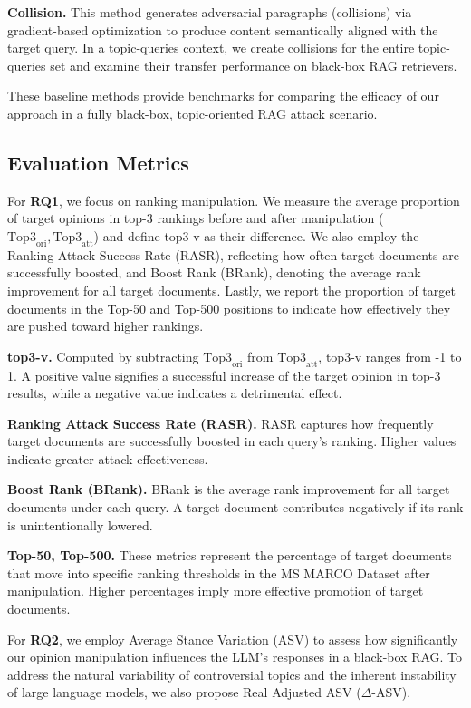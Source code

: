 \textbf{Collision.}
This method generates adversarial paragraphs (collisions) via gradient-based optimization to produce content semantically aligned with the target query. In a topic-queries context, we create collisions for the entire topic-queries set and examine their transfer performance on black-box RAG retrievers.

These baseline methods provide benchmarks for comparing the efficacy of our approach in a fully black-box, topic-oriented RAG attack scenario.

\subsection{Evaluation Metrics}

For \textbf{RQ1}, we focus on ranking manipulation. We measure the average proportion of target opinions in top-3 rankings before and after manipulation (\(\text{Top3}_{\text{ori}}, \text{Top3}_{\text{att}}\)) and define top3-v as their difference. We also employ the Ranking Attack Success Rate (RASR), reflecting how often target documents are successfully boosted, and Boost Rank (BRank), denoting the average rank improvement for all target documents. Lastly, we report the proportion of target documents in the Top-50 and Top-500 positions to indicate how effectively they are pushed toward higher rankings.

\textbf{top3-v.} Computed by subtracting \(\text{Top3}_{\text{ori}}\) from \(\text{Top3}_{\text{att}}\), top3-v ranges from -1 to 1. A positive value signifies a successful increase of the target opinion in top-3 results, while a negative value indicates a detrimental effect.

\textbf{Ranking Attack Success Rate (RASR).} RASR captures how frequently target documents are successfully boosted in each query’s ranking. Higher values indicate greater attack effectiveness.

\textbf{Boost Rank (BRank).} BRank is the average rank improvement for all target documents under each query. A target document contributes negatively if its rank is unintentionally lowered.

\textbf{Top-50, Top-500.} These metrics represent the percentage of target documents that move into specific ranking thresholds in the MS MARCO Dataset after manipulation. Higher percentages imply more effective promotion of target documents. 


For \textbf{RQ2}, we employ Average Stance Variation (ASV) to assess how significantly our opinion manipulation influences the LLM’s responses in a black-box RAG. To address the natural variability of controversial topics and the inherent instability of large language models, we also propose Real Adjusted ASV (\(\Delta\)-ASV).

